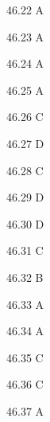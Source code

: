 \begin{Solution}{46.{22}}
A
\end{Solution}
\begin{Solution}{46.{23}}
A
\end{Solution}
\begin{Solution}{46.{24}}
A
\end{Solution}
\begin{Solution}{46.{25}}
A
\end{Solution}
\begin{Solution}{46.{26}}
C
\end{Solution}
\begin{Solution}{46.{27}}
D
\end{Solution}
\begin{Solution}{46.{28}}
C
\end{Solution}
\begin{Solution}{46.{29}}
D
\end{Solution}
\begin{Solution}{46.{30}}
D
\end{Solution}
\begin{Solution}{46.{31}}
C
\end{Solution}
\begin{Solution}{46.{32}}
B
\end{Solution}
\begin{Solution}{46.{33}}
A
\end{Solution}
\begin{Solution}{46.{34}}
A
\end{Solution}
\begin{Solution}{46.{35}}
C
\end{Solution}
\begin{Solution}{46.{36}}
C
\end{Solution}
\begin{Solution}{46.{37}}
A
\end{Solution}

